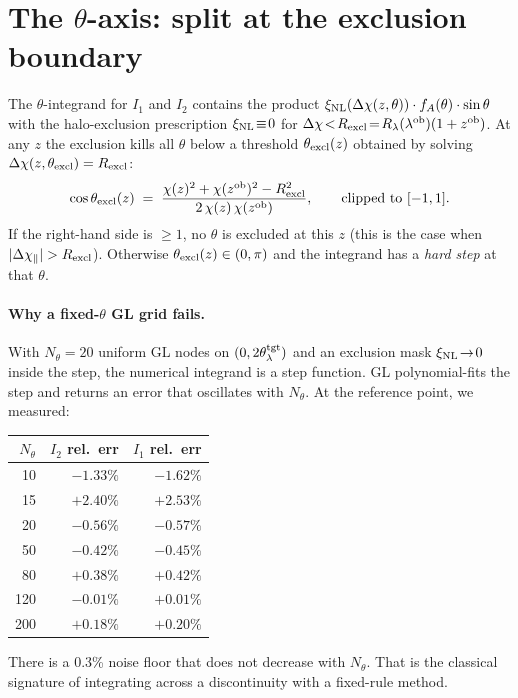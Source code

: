 \documentclass[11pt]{article}
\newcommand{\lob}{\lambda^{\rm ob}}
\newcommand{\zob}{z^{\rm ob}}
\newcommand{\xinl}{\xi_{\rm NL}}
\begin{document}
\section{The \(\theta\)-axis: split at the exclusion boundary}
\label{sec:theta_split}

The \(\theta\)-integrand for \(I_1\) and \(I_2\) contains the
product \(\xinl(\Delta\chi(z,\theta))\cdot f_A(\theta)\cdot
\sin\theta\) with the halo-exclusion prescription
\(\xinl\!\equiv\!0\) for
\(\Delta\chi\!<\!R_{\rm excl}\!=\!R_\lambda(\lob)(1+\zob)\).
At any \(z\) the exclusion kills all \(\theta\) below a threshold
\(\theta_{\rm excl}(z)\) obtained by solving
\(\Delta\chi(z,\theta_{\rm excl})=R_{\rm excl}\):
\begin{equation}
\cos\theta_{\rm excl}(z)
\;=\;
\frac{\chi(z)^2+\chi(\zob)^2-R_{\rm excl}^2}
     {2\,\chi(z)\,\chi(\zob)},
\qquad
\text{clipped to }[-1,1].
\label{eq:theta_excl_def}
\end{equation}
If the right-hand side is \(\geq 1\), no \(\theta\) is excluded at
this \(z\) (this is the case when
\(|\Delta\chi_\parallel|>R_{\rm excl}\)). Otherwise
\(\theta_{\rm excl}(z)\in(0,\pi)\) and the integrand has a
\emph{hard step} at that \(\theta\).

\paragraph{Why a fixed-\(\theta\) GL grid fails.}
With \(N_\theta=20\) uniform GL nodes on \((0,2\theta_\lambda^{\rm tgt})\)
and an exclusion mask \(\xinl\!\to\!0\) inside the step, the
numerical integrand is a step function. GL polynomial-fits the
step and returns an error that oscillates with \(N_\theta\). At the
reference point, we measured:
\begin{center}
\small
\begin{tabular}{r r r}
\toprule
\(N_\theta\) & \(I_2\) rel.\ err & \(I_1\) rel.\ err \\
\midrule
10  & \(-1.33\%\) & \(-1.62\%\) \\
15  & \(+2.40\%\) & \(+2.53\%\) \\
20  & \(-0.56\%\) & \(-0.57\%\) \\
50  & \(-0.42\%\) & \(-0.45\%\) \\
80  & \(+0.38\%\) & \(+0.42\%\) \\
120 & \(-0.01\%\) & \(+0.01\%\) \\
200 & \(+0.18\%\) & \(+0.20\%\) \\
\bottomrule
\end{tabular}
\end{center}
There is a 0.3\% noise floor that does not decrease with
\(N_\theta\). That is the classical signature of integrating across
a discontinuity with a fixed-rule method.
\end{document}
